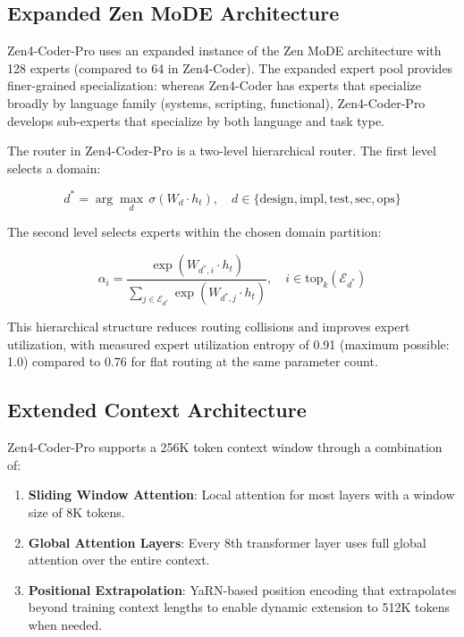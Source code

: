 \documentclass[11pt,a4paper]{article}
\begin{document}
\subsection{Expanded Zen MoDE Architecture}

Zen4-Coder-Pro uses an expanded instance of the Zen MoDE architecture with 128 experts (compared to 64 in Zen4-Coder). The expanded expert pool provides finer-grained specialization: whereas Zen4-Coder has experts that specialize broadly by language family (systems, scripting, functional), Zen4-Coder-Pro develops sub-experts that specialize by both language and task type.

The router in Zen4-Coder-Pro is a two-level hierarchical router. The first level selects a domain:

\begin{equation}
  d^* = \arg\max_d \, \sigma(W_d \cdot h_t), \quad d \in \{\text{design}, \text{impl}, \text{test}, \text{sec}, \text{ops}\}
\end{equation}

The second level selects experts within the chosen domain partition:

\begin{equation}
  \alpha_i = \frac{\exp(W_{d^*,i} \cdot h_t)}{\sum_{j \in \mathcal{E}_{d^*}} \exp(W_{d^*,j} \cdot h_t)}, \quad i \in \text{top}_k(\mathcal{E}_{d^*})
\end{equation}

This hierarchical structure reduces routing collisions and improves expert utilization, with measured expert utilization entropy of 0.91 (maximum possible: 1.0) compared to 0.76 for flat routing at the same parameter count.

\subsection{Extended Context Architecture}

Zen4-Coder-Pro supports a 256K token context window through a combination of:

\begin{enumerate}
  \item \textbf{Sliding Window Attention}: Local attention for most layers with a window size of 8K tokens.
  \item \textbf{Global Attention Layers}: Every 8th transformer layer uses full global attention over the entire context.
  \item \textbf{Positional Extrapolation}: YaRN-based position encoding that extrapolates beyond training context lengths to enable dynamic extension to 512K tokens when needed.
\end{enumerate}
\end{document}
